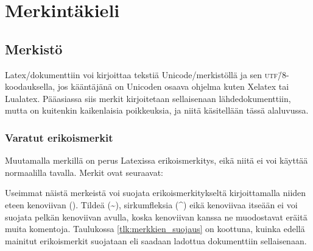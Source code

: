 \chapter{Merkintäkieli}


\section{Merkistö}

Latex\-/dokumenttiin voi kirjoittaa tekstiä Unicode\-/merkistöllä ja sen
\textsc{utf}\=/8\/-koodauksella, jos kääntäjänä on Unicoden osaava
ohjelma kuten Xelatex tai Lualatex. Pääasiassa siis merkit kirjoitetaan
sellaisenaan lähdedokumenttiin, mutta on kuitenkin kaikenlaisia
poikkeuksia, ja niitä käsitellään tässä alaluvussa.

\subsection{Varatut erikoismerkit}

Muutamalla merkillä on perus Latexissa erikoismerkitys, eikä niitä ei
voi käyttää normaalilla tavalla. Merkit ovat seuraavat:

\begin{koodilohkosis}
\end{koodilohkosis}

Useimmat näistä merkeistä voi suojata erikoismerkitykseltä
kirjoittamalla niiden eteen kenoviivan (\keno). Tildeä
(\textasciitilde), sirkumfleksia (\textasciicircum) eikä kenoviivaa
itseään ei voi suojata pelkän kenoviivan avulla, koska kenoviivan kanssa
ne muodostavat eräitä muita komentoja. Taulukossa
\ref{tlk:merkkien_suojaus} on koottuna, kuinka edellä mainitut
erikoismerkit suojataan eli saadaan ladottua dokumenttiin sellaisenaan.

